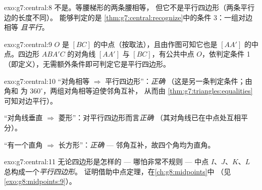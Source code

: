 \begin{solution}{exo:g7:central:8}
不是。等腰梯形的两条腰相等，
但它不是平行四边形（两条平行边的长度不同）。
能够判定的是
\cref{thm:g7:central:recognize}中的条件 3：一组对边相等
\emph{且平行}。
\end{solution}

\begin{solution}{exo:g7:central:9}
$O$ 是 $[BC]$ 的中点（按取法），且由作图可知它也是
$[AA']$ 的中点。四边形 $ABA'C$
的对角线 $[AA']$ 与 $[BC]$，有公共中点 $O$，依判定条件
1（即定义），无需额外条件即可判定它是平行四边形。
\end{solution}

\begin{solution}{exo:g7:central:10}
“对角相等 $\Rightarrow$ 平行四边形”：\emph{正确}
（这是另一条判定条件；由角和
为 $360^\circ$，两组对角相等迫使邻角互补，
从而由
\cref{thm:g7:triangles:equalities}可知对边平行）。

“对角线垂直 $\Rightarrow$ 菱形”：对平行四边形而言\emph{正确}
（其对角线已在中点处互相平分）。

“有一个直角 $\Rightarrow$ 长方形”：\emph{正确} ---
邻角互补，故四个角均为直角。
\end{solution}

\begin{solution}{exo:g7:central:11}
无论四边形是怎样的 --- 哪怕非常不规则 --- 中点
$I$、$J$、$K$、$L$ 总构成一个\emph{平行四边形}。
证明借助中点定理，在\cref{ch:g8:midpoints}中
（见\cref{exo:g8:midpoints:9}）。
\end{solution}

